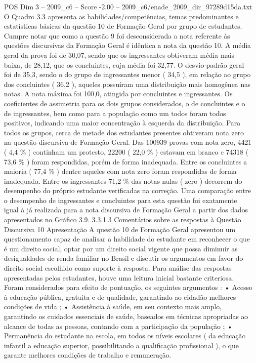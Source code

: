 \begin{textsample}{POS Dim 3 – 2009\_c6 – Score -2.00 – 2009\_c6/enade\_2009\_dir\_97289d15da.txt}
O Quadro 3.3 apresenta as habilidades/competências, temas predominantes e estatísticas básicas da questão 10 de Formação Geral por grupo de estudantes.
Cumpre notar que como a questão 9 foi desconsiderada a nota referente às questões discursivas da Formação Geral é idêntica a nota da questão 10.
A média geral da prova foi de 30,07, sendo que os ingressantes obtiveram média mais baixa, de 28,12, que os concluintes, cuja média foi 32,77.
O desvio-padrão geral foi de 35,3, sendo o do grupo de ingressantes menor ( 34,5 ), em relação ao grupo dos concluintes ( 36,2 ), aqueles possuíram uma distribuição mais homogênea nas notas.
A nota máxima foi 100,0, atingida por concluintes e ingressantes.
Os coeficientes de assimetria para os dois grupos considerados, o de concluintes e o de ingressantes, bem como para a população como um todos foram todos positivos, indicando uma maior concentração à esquerda da distribuição.
Para todos os grupos, cerca de metade dos estudantes presentes obtiveram nota zero na questão discursiva de Formação Geral.
Das 100939 provas com nota zero, 4421 ( 4,4 \% ) continham um protesto, 22200 ( 22,0 \% ) estavam em branco e 74318 ( 73,6 \% ) foram respondidas, porém de forma inadequada.
Entre os concluintes a maioria ( 77,4 \% ) dentre aqueles com nota zero foram respondidas de forma inadequada.
Entre os ingressantes 71,2 \% das notas nulas ( zero ) decorrem do desempenho do próprio estudante verificadas na correção.
Uma comparação entre o desempenho de ingressantes e concluintes para esta questão foi exatamente igual à já realizada para a nota discursiva de Formação Geral a partir dos dados apresentados no Gráfico 3.9. 3.3.1.3 Comentários sobre as respostas à Questão Discursiva 10 Apresentação A questão 10 de Formação Geral apresentou um questionamento capaz de analisar a habilidade do estudante em reconhecer o que é um direito social, optar por um direito social vigente que possa diminuir as desigualdades de renda familiar no Brasil e discutir os argumentos em favor do direito social escolhido como suporte à resposta.
Para análise das respostas apresentadas pelos estudantes, houve uma leitura inicial bastante criteriosa.
Foram considerados para efeito de pontuação, os seguintes argumentos : • Acesso à educação pública, gratuita e de qualidade, garantindo ao cidadão melhores condições de vida ; • Assistência à saúde, em seu contexto mais amplo, garantindo os cuidados essenciais de saúde, baseados em técnicas apropriadas ao alcance de todas as pessoas, contando com a participação da população ; • Permanência do estudante na escola, em todos os níveis escolares ( da educação infantil a educação superior, possibilitando a qualificação profissional ), o que garante melhores condições de trabalho e remuneração.

\end{textsample}
